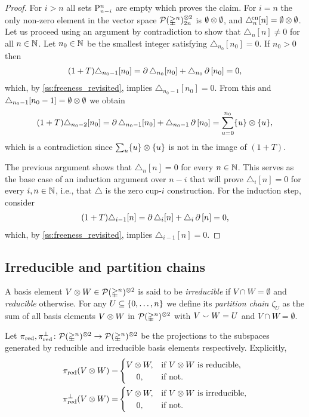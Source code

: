 \begin{proof}
	For $i > n$ all sets $\P_{n-i}^n$ are empty which proves the claim.
	For $i = n$ the only non-zero element in the vector space $\cP(\simplex^n)^{\ot 2}_{2n}$ is $\emptyset \ot \emptyset$, and $\canonical_n[n] = \emptyset \ot \emptyset$.
	Let us proceed using an argument by contradiction to show that $\triangle_n[n] \neq 0$ for all $n \in \N$.
	Let $n_0 \in \N$ be the smallest integer satisfying $\triangle_{n_0}[n_0] = 0$.
	If $n_0 > 0$ then
	\begin{align*}
	(1+T) \triangle_{n_0-1} [n_0] =
	\bd \triangle_{n_0} [n_0] + \triangle_{n_0} \bd \, [n_0] = 0,
	\end{align*}
	which, by \cref{ss:freeness_revisited}, implies $\triangle_{n_0-1}[n_0] = 0$.
	From this and $\triangle_{n_0-1}[n_0-1] = \emptyset \ot \emptyset$ we obtain
	\[
	(1+T)\triangle_{n_0-2}[n_0] =
	\bd \triangle_{n_0-1}[n_0] + \triangle_{n_0-1} \bd \, [n_0] =
	\sum_{u = 0}^{n_0} \{u\} \ot \{u\},
	\]
	which is a contradiction since $\sum_u \{u\} \ot \{u\}$ is not in the image of $(1+T)$.

	The previous argument shows that $\triangle_n [n] = 0$ for every $n \in \N$.
	This serves as the base case of an induction argument over $n-i$ that will prove $\triangle_i [n] = 0$ for every $i, n \in \N$, i.e., that $\triangle$ is the zero \mbox{cup-$i$} construction.
	For the induction step, consider
	\begin{align*}
	(1+T) \triangle_{i-1} [n] =
	\bd \triangle_{i} [n] + \triangle_{i} \bd\, [n] = 0,
	\end{align*}
	which, by \cref{ss:freeness_revisited}, implies $\triangle_{i-1} [n] = 0$.
\end{proof}

\subsection{Irreducible and partition chains}

A basis element $V \ot W \in \cP(\simplex^n)^{\ot 2}$ is said to be \textit{irreducible} if $V \cap W = \emptyset$ and \textit{reducible} otherwise.
For any $U \subseteq \set{0,\dots,n}$ we define its \textit{partition chain} $\zeta_U$ as the sum of all basis elements $V \ot W$ in $\cP(\simplex^n)^{\ot 2}$ with $V \union W = U$ and $V \cap W = \emptyset$.

Let $\pired,\pi^\perp_{\text{red}} \colon \cP(\simplex^n)^{\ot 2} \to \cP(\simplex^n)^{\ot 2}$ be the projections to the subspaces generated by reducible and irreducible basis elements respectively.
Explicitly,
\begin{align*}
	\pired(V \ot W) =&
	\begin{cases}
		V \ot W, & \text{if $V \ot W$ is reducible},\\
		\hfil 0, & \text{if not}.
	\end{cases} \\
	\pi^\perp_{\text{red}}(V \ot W) =&
	\begin{cases}
		V \ot W, & \text{if $V \ot W$ is irreducible},\\
		\hfil 0, & \text{if not}.
	\end{cases}
\end{align*}


